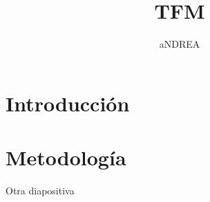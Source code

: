 \documentclass[11pt]{beamer}
\author{aNDREA}
\title{TFM}
\institute{ UNIZAR}
\date{}
\begin{document}
{
\begin{frame}
\titlepage
\end{frame}

\begin{frame}
\tableofcontents
\end{frame}
}

\section{Introducción}




\section{Metodología}

\begin{frame}{Otra diapositiva}

\end{frame}
\end{document}
